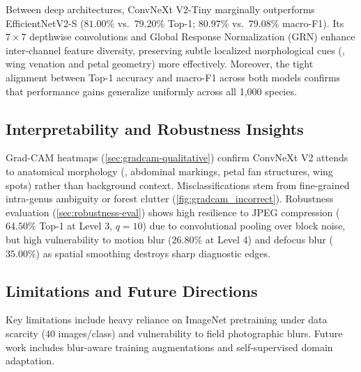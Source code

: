 Between deep architectures, ConvNeXt V2-Tiny marginally outperforms EfficientNetV2-S ($81.00\%$ vs.\ $79.20\%$ Top-1; $80.97\%$ vs.\ $79.08\%$ macro-F1). Its $7 \times 7$ depthwise convolutions and Global Response Normalization (GRN) enhance inter-channel feature diversity, preserving subtle localized morphological cues (\eg, wing venation and petal geometry) more effectively. Moreover, the tight alignment between Top-1 accuracy and macro-F1 across both models confirms that performance gains generalize uniformly across all 1{,}000 species.

\subsection{Interpretability and Robustness Insights}
\label{sec:disc-interp}
Grad-CAM heatmaps (\cref{sec:gradcam-qualitative}) confirm ConvNeXt V2 attends to anatomical morphology (\eg, abdominal markings, petal fan structures, wing spots) rather than background context. Misclassifications stem from fine-grained intra-genus ambiguity or forest clutter (\cref{fig:gradcam_incorrect}). Robustness evaluation (\cref{sec:robustness-eval}) shows high resilience to JPEG compression ($64.50\%$ Top-1 at Level 3, $q=10$) due to convolutional pooling over block noise, but high vulnerability to motion blur ($26.80\%$ at Level 4) and defocus blur ($35.00\%$) as spatial smoothing destroys sharp diagnostic edges.

\subsection{Limitations and Future Directions}
\label{sec:disc-limitations}
Key limitations include heavy reliance on ImageNet pretraining under data scarcity ($40$ images/class) and vulnerability to field photographic blurs. Future work includes blur-aware training augmentations and self-supervised domain adaptation.
